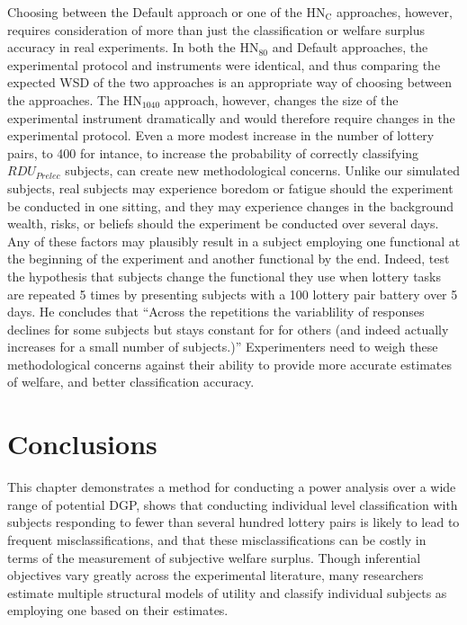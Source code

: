 \documentclass[../main.tex]{subfiles}
\begin{document}
Choosing between the Default approach or one of the $\text{HN}_\text{C}$ approaches, however, requires consideration of more than just the classification or welfare surplus accuracy in real experiments.
In both the $\text{HN}_{80}$ and Default approaches, the experimental protocol and instruments were identical, and thus comparing the expected WSD of the two approaches is an appropriate way of choosing between the approaches.
The $\text{HN}_{1040}$ approach, however, changes the size of the experimental instrument dramatically and would therefore require changes in the experimental protocol.
Even a more modest increase in the number of lottery pairs, to 400 for intance, to increase the probability of correctly classifying $\mathit{RDU_{Prelec}}$ subjects, can create new methodological concerns.
Unlike our simulated subjects, real subjects may experience boredom or fatigue should the experiment be conducted in one sitting, and they may experience changes in the background wealth, risks, or beliefs should the experiment be conducted over several days.
Any of these factors may plausibly result in a subject employing one functional at the beginning of the experiment and another functional by the end.
Indeed, \textcite{Hey2001} test the hypothesis that subjects change the functional they use when lottery tasks are repeated 5 times by presenting subjects with a 100 lottery pair battery over 5 days.
He concludes that \enquote{Across the repetitions the variablility of responses declines for some subjects but stays constant for for others (and indeed actually increases for a small number of subjects.)}
Experimenters need to weigh these methodological concerns against their ability to provide more accurate estimates of welfare, and better classification accuracy.

\singlespacing
\section{Conclusions}
\doublespacing

This chapter demonstrates a method for conducting a power analysis over a wide range of potential DGP, shows that conducting individual level classification with subjects responding to fewer than several hundred lottery pairs is likely to lead to frequent misclassifications, and that these misclassifications can be costly in terms of the measurement of subjective welfare surplus.
Though inferential objectives vary greatly across the experimental literature, many researchers estimate multiple structural models of utility and classify individual subjects as employing one based on their estimates.
\end{document}

